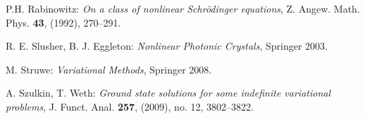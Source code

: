 \documentclass{scrartcl}
\newcommand{\R}{\mathbb{R}}
\numberwithin{equation}{section}
\begin{document}
\begin{thebibliography}{99}

 P.H. Rabinowitz: {\em On a class of nonlinear Schr\"odinger equations}, Z. Angew. Math. Phys. \textbf{43}, (1992), 270--291.





 R. E. Slusher, B. J. Eggleton: {\em Nonlinear Photonic Crystals}, Springer 2003.

 M. Struwe: {\em Variational Methods}, Springer 2008.


 A. Szulkin, T. Weth: {\em Ground state solutions for some indefinite variational problems}, J. Funct. Anal. \textbf{257}, (2009), no. 12, 3802--3822. 







\end{thebibliography}
\end{document}
